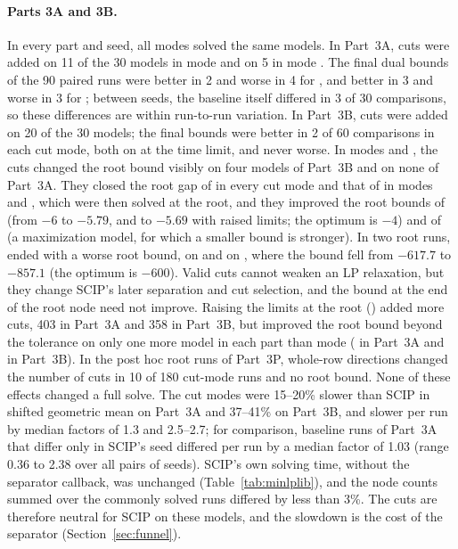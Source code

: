 \paragraph{Parts 3A and 3B.} In every part and seed, all modes solved the same
models. In Part~3A, cuts were added on 11 of the 30 models in mode 
and on 5 in mode . The final dual bounds of the 90 paired runs were
better in 2 and worse in 4 for , and better in 3 and worse in 3 for
; between seeds, the baseline itself differed in 3 of 30
comparisons, so these differences are within run-to-run variation. In
Part~3B, cuts were added on 20 of the 30 models; the final bounds were better
in 2 of 60 comparisons in each cut mode, both on  at
the time limit, and never worse. In modes  and , the cuts changed
the root bound visibly on four models of Part~3B and on none of Part~3A. They closed the root gap of
 in every cut mode and that of
 in modes  and , which were
then solved at the root, and they improved the root bounds of 
(from $-6$ to $-5.79$, and to $-5.69$ with raised limits; the optimum is $-4$)
and of  (a maximization model, for which a smaller bound is
stronger). In two root runs,  ended with a worse root
bound, on  and on , where the bound
fell from $-617.7$ to $-857.1$ (the optimum is $-600$). Valid cuts cannot
weaken an LP relaxation, but they change SCIP's later separation and cut
selection, and the bound at the end of the root node need not improve.
Raising the limits at the root () added more cuts, 403 in
Part~3A and 358 in Part~3B, but improved the root bound beyond the tolerance on
only one more model in each part than mode  (
in Part~3A and  in Part~3B). In the post hoc root runs of Part~3P, whole-row
directions changed the number of cuts in 10 of 180 cut-mode runs and no root
bound. None of these effects changed a full solve. The cut
modes were 15--20\% slower than SCIP in shifted geometric mean on
Part~3A and 37--41\% on Part~3B, and slower per run by median factors of 1.3 and
2.5--2.7; for comparison, baseline runs of Part~3A that differ only in SCIP's
seed differed per run by a median factor of 1.03 (range 0.36 to 2.38 over all
pairs of seeds). SCIP's
own solving time, without the separator callback, was unchanged (Table~\ref{tab:minlplib}), and the node counts summed over the
commonly solved runs differed by less than 3\%. The cuts are therefore neutral
for SCIP on these models, and the slowdown is the cost of the separator
(Section~\ref{sec:funnel}).


